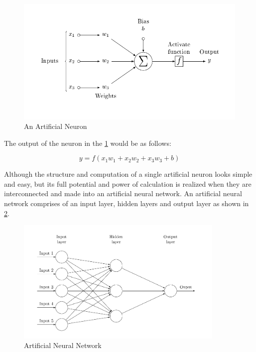 \begin{figure}[!ht]
    \centering
    \captionsetup{justification=centering,margin=2cm}
    \includegraphics[width=12cm]{pics/ArtificialNeuronModel.png}
    \caption{An Artificial Neuron}
    \label{fig:neuron}
\end{figure}

The output of the neuron in the \ref{fig:neuron} would be as follows:

\begin{equation}
y=f(x_{1}w_{1}+x_{2}w_{2}+x_{3}w_{3}+b)
\label{eq:NNformula}
\end{equation}

Although the structure and computation of a single artificial neuron looks simple and easy, but its full potential and power of calculation is realized when they are interconnected and made into an artificial neural network. An artificial neural network comprises of an input layer, hidden layers and output layer as shown in \ref{fig:NN}.
\begin{figure}[!ht]
    \centering
    \captionsetup{justification=centering,margin=2cm}
    \includegraphics[width=10cm]{pics/neural_network.png}
    \caption{Artificial Neural Network}
    \label{fig:NN}
\end{figure}

